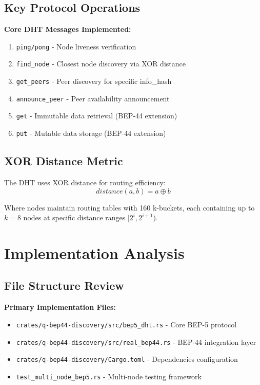 \documentclass[11pt,a4paper]{article}
\begin{document}
\subsection{Key Protocol Operations}

\textbf{Core DHT Messages Implemented:}
\begin{enumerate}
    \item \texttt{ping/pong} - Node liveness verification
    \item \texttt{find\_node} - Closest node discovery via XOR distance
    \item \texttt{get\_peers} - Peer discovery for specific info\_hash
    \item \texttt{announce\_peer} - Peer availability announcement
    \item \texttt{get} - Immutable data retrieval (BEP-44 extension)
    \item \texttt{put} - Mutable data storage (BEP-44 extension)
\end{enumerate}

\subsection{XOR Distance Metric}

The DHT uses XOR distance for routing efficiency:
\begin{equation}
distance(a, b) = a \oplus b
\end{equation}

Where nodes maintain routing tables with 160 k-buckets, each containing up to $k=8$ nodes at specific distance ranges $[2^i, 2^{i+1})$.

\section{Implementation Analysis}

\subsection{File Structure Review}

\textbf{Primary Implementation Files:}
\begin{itemize}
    \item \texttt{crates/q-bep44-discovery/src/bep5\_dht.rs} - Core BEP-5 protocol
    \item \texttt{crates/q-bep44-discovery/src/real\_bep44.rs} - BEP-44 integration layer
    \item \texttt{crates/q-bep44-discovery/Cargo.toml} - Dependencies configuration
    \item \texttt{test\_multi\_node\_bep5.rs} - Multi-node testing framework
\end{itemize}
\end{document}
